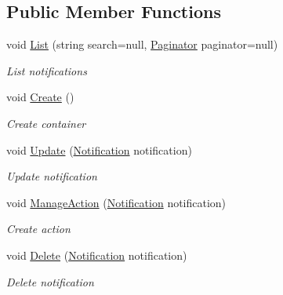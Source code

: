 \subsection*{Public Member Functions}
\begin{DoxyCompactItemize}
\item 
void \mbox{\hyperlink{class_gtd_app_1_1_console_1_1_controllers_1_1_notification_controller_a170833ac57ea6ae1111fbb29e30c5201}{List}} (string search=null, \mbox{\hyperlink{class_gtd_app_1_1_repository_1_1_paginator}{Paginator}} paginator=null)
\begin{DoxyCompactList}\small\item\em List notifications \end{DoxyCompactList}\item 
void \mbox{\hyperlink{class_gtd_app_1_1_console_1_1_controllers_1_1_notification_controller_a8e172c8d1f1f51bd9d537e6dcb241e10}{Create}} ()
\begin{DoxyCompactList}\small\item\em Create container \end{DoxyCompactList}\item 
void \mbox{\hyperlink{class_gtd_app_1_1_console_1_1_controllers_1_1_notification_controller_a39dc538e1e44a9fc9d0ef42d123231c3}{Update}} (\mbox{\hyperlink{class_gtd_app_1_1_data_1_1_notification}{Notification}} notification)
\begin{DoxyCompactList}\small\item\em Update notification \end{DoxyCompactList}\item 
void \mbox{\hyperlink{class_gtd_app_1_1_console_1_1_controllers_1_1_notification_controller_a8cd848e8facd8e4bacfb40f323238d7d}{Manage\+Action}} (\mbox{\hyperlink{class_gtd_app_1_1_data_1_1_notification}{Notification}} notification)
\begin{DoxyCompactList}\small\item\em Create action \end{DoxyCompactList}\item 
void \mbox{\hyperlink{class_gtd_app_1_1_console_1_1_controllers_1_1_notification_controller_a0b4e6cdacb7c74aa29bd07ccd7a49a4f}{Delete}} (\mbox{\hyperlink{class_gtd_app_1_1_data_1_1_notification}{Notification}} notification)
\begin{DoxyCompactList}\small\item\em Delete notification \end{DoxyCompactList}\end{DoxyCompactItemize}


